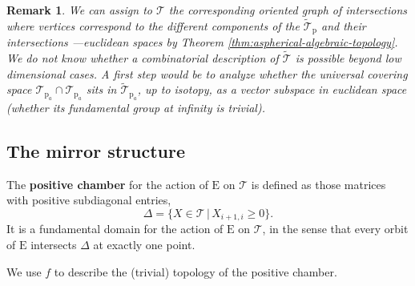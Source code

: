 \documentclass[reqno]{amsart}
\newcommand{\p}{\mathrm{p}}
\newcommand{\cT}{\mathcal{T}}
\newcommand{\E}{\mathrm{E}}
\newtheorem{remark}[theorem]{Remark}
\begin{document}
\begin{remark} We can assign to $\cT$ the corresponding oriented graph of intersections where vertices correspond to the different components of the  $\widetilde{\cT}_\p$ and their intersections ---euclidean spaces by Theorem \ref{thm:aspherical-algebraic-topology}.
We do not know whether a combinatorial description of $\widetilde{\cT}$ is possible beyond low dimensional cases. A first step  would be to analyze whether the universal covering space $\cT_{\p_a}\cap \cT_{\p_a}$  sits in $\widetilde{\cT}_{\p_a}$, up to isotopy, as a vector subspace in euclidean space (whether its fundamental group at infinity is trivial).
\end{remark}

\subsection{The mirror structure}\label{ssec:mirror}
The {\bf positive chamber} for the action of $\E$ on $\cT$ is defined as those matrices with positive subdiagonal entries,
\[\Delta=\{X\in \cT\,|\, X_{i+1,i}\geq 0\}.\]
It is a fundamental domain for the action of $\E$ on $\cT$, in the sense that every orbit of $\mathrm{E}$ intersects $\Delta$ at exactly one point.

We use $f$ to describe the (trivial) topology of the positive chamber.
\end{document}
